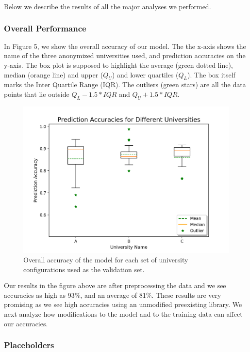 Below we describe the results of all the major analyses we performed.

\subsubsection{Overall Performance}

In Figure 5, we show the overall accuracy of our model. The the x-axis shows the name of the three anonymized universities used, and prediction accuracies on the y-axis. The box plot is supposed to highlight the average (green dotted line), median (orange line) and upper ($Q_U$) and lower quartiles ($Q_L$). The box itself marks the Inter Quartile Range (IQR). The outliers (green stars) are all the data points that lie outside $Q_L - 1.5*IQR$ and $Q_U+1.5*IQR$.\\

\begin{figure}[H]
	\centering
	\includegraphics[width=5in]{uni_analysis.png}
	\caption{Overall accuracy of the model for each set of university configurations used as the validation set.}
\end{figure}

 Our results in the figure above are after preprocessing the data and we see accuracies as high as 93\%, and an average of 81\%. These results are very promising as we see high accuracies using an unmodified preexisting library. We next analyze how modifications to the model and to the training data can affect our accuracies.

\subsubsection{Placeholders}

